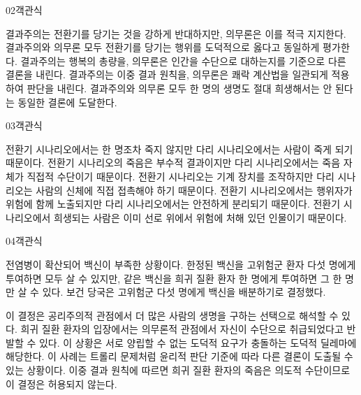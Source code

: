 \documentclass[fs85,seriesWit]{korfarm-base}
\begin{document}
\begin{kfQBlock}{02}{객관식}
\begin{kfChoices}
\kfChoice 결과주의는 전환기를 당기는 것을 강하게 반대하지만, 의무론은 이를 적극 지지한다.
\kfChoice 결과주의와 의무론 모두 전환기를 당기는 행위를 도덕적으로 옳다고 동일하게 평가한다.
\kfChoice 결과주의는 행복의 총량을, 의무론은 인간을 수단으로 대하는지를 기준으로 다른 결론을 내린다.
\kfChoice 결과주의는 이중 결과 원칙을, 의무론은 쾌락 계산법을 일관되게 적용하여 판단을 내린다.
\kfChoice 결과주의와 의무론 모두 한 명의 생명도 절대 희생해서는 안 된다는 동일한 결론에 도달한다.
\end{kfChoices}
\end{kfQBlock}

\begin{kfQBlock}{03}{객관식}
\begin{kfChoices}
\kfChoice 전환기 시나리오에서는 한 명조차 죽지 않지만 다리 시나리오에서는 사람이 죽게 되기 때문이다.
\kfChoice 전환기 시나리오의 죽음은 부수적 결과이지만 다리 시나리오에서는 죽음 자체가 직접적 수단이기 때문이다.
\kfChoice 전환기 시나리오는 기계 장치를 조작하지만 다리 시나리오는 사람의 신체에 직접 접촉해야 하기 때문이다.
\kfChoice 전환기 시나리오에서는 행위자가 위험에 함께 노출되지만 다리 시나리오에서는 안전하게 분리되기 때문이다.
\kfChoice 전환기 시나리오에서 희생되는 사람은 이미 선로 위에서 위험에 처해 있던 인물이기 때문이다.
\end{kfChoices}
\end{kfQBlock}

\begin{kfQBlock}{04}{객관식}
\begin{kfEvidence}전염병이 확산되어 백신이 부족한 상황이다. 한정된 백신을 고위험군 환자 다섯 명에게 투여하면 모두 살 수 있지만, 같은 백신을 희귀 질환 환자 한 명에게 투여하면 그 한 명만 살 수 있다. 보건 당국은 고위험군 다섯 명에게 백신을 배분하기로 결정했다.\end{kfEvidence}
\begin{kfChoices}
\kfChoice 이 결정은 공리주의적 관점에서 더 많은 사람의 생명을 구하는 선택으로 해석할 수 있다.
\kfChoice 희귀 질환 환자의 입장에서는 의무론적 관점에서 자신이 수단으로 취급되었다고 반발할 수 있다.
\kfChoice 이 상황은 서로 양립할 수 없는 도덕적 요구가 충돌하는 도덕적 딜레마에 해당한다.
\kfChoice 이 사례는 트롤리 문제처럼 윤리적 판단 기준에 따라 다른 결론이 도출될 수 있는 상황이다.
\kfChoice 이중 결과 원칙에 따르면 희귀 질환 환자의 죽음은 의도적 수단이므로 이 결정은 허용되지 않는다.
\end{kfChoices}
\end{kfQBlock}
\end{document}
